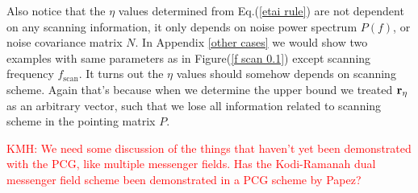 \documentclass[twocolumn,linenumbers]{aastex631}
\newcommand{\vbd}{\vb{d}}
\newcommand{\hatm}{\vb{\hat{m}}}
\newcommand{\Nbar}{\bar{N}}
\newcommand{\kmh}[1]{\textcolor{red}{KMH: #1}}
\begin{document}
Also notice that the $\eta$ values determined from Eq.(\ref{etai rule})
are not dependent on any scanning information,
it only depends on noise power spectrum $P(f)$, or noise covariance matrix $N$.
In Appendix \ref{other cases} we would show 
two examples with same parameters as in Figure(\ref{f scan 0.1}) except 
scanning frequency $f_{\text{scan}}$.%
It turns out the $\eta$ values should somehow depends
on scanning scheme.
Again that's because when we determine the upper bound%
we treated
$\vb{r}_{\eta}$ %
as an arbitrary vector, such that we lose all information related to scanning 
scheme in the pointing matrix $P$.


\kmh{We need some discussion of the things that haven't yet been demonstrated with the PCG, like multiple messenger fields.  Has the Kodi-Ramanah dual messenger field scheme been demonstrated in a PCG scheme by Papez?}

%
\end{document}
